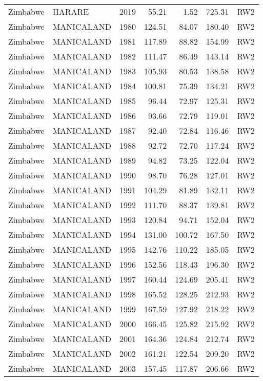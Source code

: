 \begin{longtable}{lllrrrl}
  Zimbabwe & HARARE & 2019 & 55.21 & 1.52 & 725.31 & RW2 \\ 
  Zimbabwe & MANICALAND & 1980 & 124.51 & 84.07 & 180.40 & RW2 \\ 
  Zimbabwe & MANICALAND & 1981 & 117.89 & 88.82 & 154.99 & RW2 \\ 
  Zimbabwe & MANICALAND & 1982 & 111.47 & 86.49 & 143.14 & RW2 \\ 
  Zimbabwe & MANICALAND & 1983 & 105.93 & 80.53 & 138.58 & RW2 \\ 
  Zimbabwe & MANICALAND & 1984 & 100.81 & 75.39 & 134.21 & RW2 \\ 
  Zimbabwe & MANICALAND & 1985 & 96.44 & 72.97 & 125.31 & RW2 \\ 
  Zimbabwe & MANICALAND & 1986 & 93.66 & 72.79 & 119.01 & RW2 \\ 
  Zimbabwe & MANICALAND & 1987 & 92.40 & 72.84 & 116.46 & RW2 \\ 
  Zimbabwe & MANICALAND & 1988 & 92.72 & 72.70 & 117.24 & RW2 \\ 
  Zimbabwe & MANICALAND & 1989 & 94.82 & 73.25 & 122.04 & RW2 \\ 
  Zimbabwe & MANICALAND & 1990 & 98.70 & 76.28 & 127.01 & RW2 \\ 
  Zimbabwe & MANICALAND & 1991 & 104.29 & 81.89 & 132.11 & RW2 \\ 
  Zimbabwe & MANICALAND & 1992 & 111.70 & 88.37 & 139.81 & RW2 \\ 
  Zimbabwe & MANICALAND & 1993 & 120.84 & 94.71 & 152.04 & RW2 \\ 
  Zimbabwe & MANICALAND & 1994 & 131.00 & 100.72 & 167.50 & RW2 \\ 
  Zimbabwe & MANICALAND & 1995 & 142.76 & 110.22 & 185.05 & RW2 \\ 
  Zimbabwe & MANICALAND & 1996 & 152.56 & 118.43 & 196.30 & RW2 \\ 
  Zimbabwe & MANICALAND & 1997 & 160.44 & 124.69 & 205.41 & RW2 \\ 
  Zimbabwe & MANICALAND & 1998 & 165.52 & 128.25 & 212.93 & RW2 \\ 
  Zimbabwe & MANICALAND & 1999 & 167.59 & 127.92 & 218.22 & RW2 \\ 
  Zimbabwe & MANICALAND & 2000 & 166.45 & 125.82 & 215.92 & RW2 \\ 
  Zimbabwe & MANICALAND & 2001 & 164.36 & 124.84 & 212.74 & RW2 \\ 
  Zimbabwe & MANICALAND & 2002 & 161.21 & 122.54 & 209.20 & RW2 \\ 
  Zimbabwe & MANICALAND & 2003 & 157.45 & 117.87 & 206.66 & RW2 \\ 

\end{longtable}
